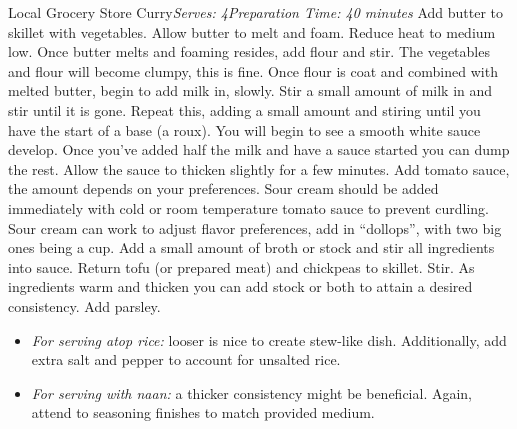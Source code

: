 \documentclass{article}
\begin{document}
\begin{recipe}{Local Grocery Store Curry}{\textit{Serves:  4}}{\textit{Preparation Time: 40 minutes}}
    Add butter to skillet with vegetables. Allow butter to melt and foam. Reduce
    heat to medium low. Once butter melts and foaming resides, add flour and
    stir. The vegetables and flour will become clumpy, this is fine. Once flour
    is coat and combined with melted butter, begin to add milk in, slowly. Stir
    a small amount of milk in and stir until it is gone. Repeat this, adding
    a small amount and stiring until you have the start of a base (a roux). You
    will begin to see a smooth white sauce develop. Once you've added half the
    milk and have a sauce started you can dump the rest. Allow the sauce to
    thicken slightly for a few minutes.
    Add tomato sauce, the amount depends on your preferences. Sour cream should
    be added immediately with cold or room temperature tomato sauce to prevent
    curdling. Sour cream can work to adjust flavor preferences, add in
    ``dollops'', with two big ones being a  cup. Add a small amount of
    broth or stock and stir all ingredients into sauce. Return tofu (or prepared
    meat) and chickpeas to skillet. Stir. As ingredients warm and thicken you can
    add stock or both to attain a desired consistency. Add parsley.
    \begin{itemize}
      \item{\textit{For serving atop rice:} looser is nice to create stew-like dish.
          Additionally, add extra salt and pepper to account for unsalted
        rice.}
      \item{\textit{For serving with naan:} a thicker consistency might be beneficial.
        Again, attend to seasoning finishes to match provided medium.}
    \end{itemize}
\end{recipe}

\theendnotes
\end{document}
